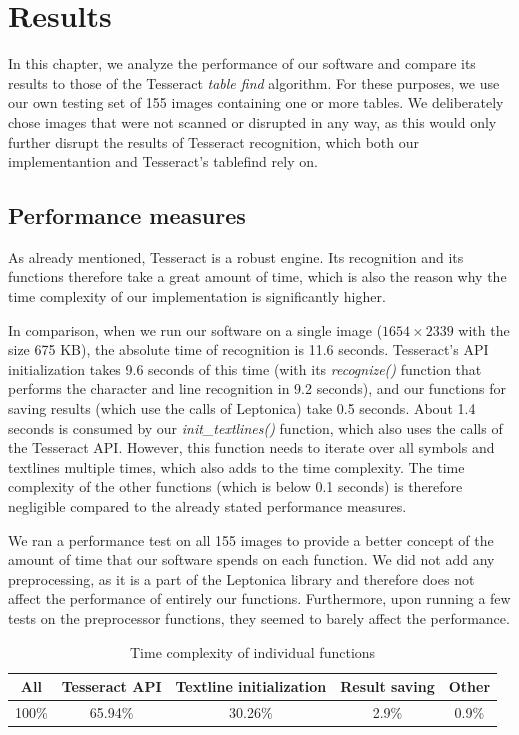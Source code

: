 \chapter{Results}

In this chapter, we analyze the performance of our software and compare its results to those of the Tesseract \emph{table find} algorithm. For these purposes, we use our own testing set of 155 images containing one or more tables. We deliberately chose images that were not scanned or disrupted in any way, as this would only further disrupt the results of Tesseract recognition, which both our implementantion and Tesseract's tablefind rely on.

\section{Performance measures}

As already mentioned, Tesseract is a robust engine. Its recognition and its functions therefore take a great amount of time, which is also the reason why the time complexity of our implementation is significantly higher.

In comparison, when we run our software on a single image ($1654\times2339$ with the size 675 KB), the absolute time of recognition is 11.6 seconds. Tesseract's API initialization takes 9.6 seconds of this time (with its \emph{recognize()} function that performs the character and line recognition in 9.2 seconds), and our functions for saving results (which use the calls of Leptonica) take 0.5 seconds. About 1.4 seconds is consumed by our \emph{init\_textlines()} function, which also uses the calls of the Tesseract API. However, this function needs to iterate over all symbols and textlines multiple times, which also adds to the time complexity. The time complexity of the other functions (which is below 0.1 seconds) is therefore negligible compared to the already stated performance measures.

We ran a performance test on all 155 images to provide a better concept of the amount of time that our software spends on each function. We did not add any preprocessing, as it is a part of the Leptonica library and therefore does not affect the performance of entirely our functions. Furthermore, upon running a few tests on the preprocessor functions, they seemed to barely affect the performance.

\begin{table}[t]
\centering
\begin{tabular}{ccccc}
\toprule
\textbf{All} & \textbf{Tesseract API} & \textbf{Textline initialization} & \textbf{Result saving} & \textbf{Other}\\
\midrule
100\% & 65.94\% & 30.26\% & 2.9\% & 0.9\% \\
\bottomrule
\end{tabular}
\caption{Time complexity of individual functions} 
\label{table:functionsComplexity}
\end{table}

